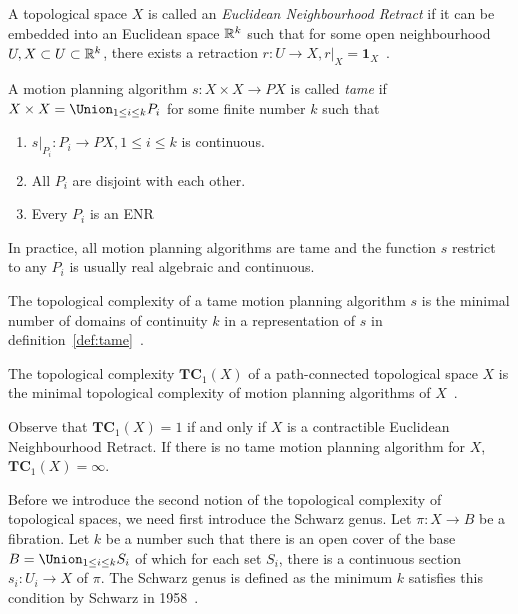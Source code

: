 A topological space \(X\) is called an \textit{Euclidean Neighbourhood Retract} if it can be embedded into an Euclidean space \(\mathbb{R}^k\) such that for some open neighbourhood \(U, X\subset U\subset \mathbb{R}^k\), there exists a retraction \(r:U\to X,r|_X=\mathbf{1}_X\)~\cite{farber2004instabilities}.
\begin{definition}\label{def:tame}
  A motion planning algorithm \(s:X\times X\to PX\) is called \emph{tame} if \(X\times X=\Union_{1\le i\le k} P_i\) for some finite number \(k\) such that
  \begin{enumerate}[label=\arabic*)]
  \item \(s|_{P_i}:P_i\to PX, 1\le i\le k\) is continuous.
  \item All \(P_i\) are disjoint with each other.
  \item Every \(P_i\) is an ENR
  \end{enumerate}
\end{definition}

In practice, all motion planning algorithms are tame and the function \(s\) restrict to any \(P_i\) is usually real algebraic and continuous.

\begin{definition}
  The topological complexity of a tame motion planning algorithm \(s\) is the minimal number of domains of continuity \(k\) in a representation of \(s\) in definition~\ref{def:tame}~\cite{farber2006topology}.
\end{definition}

\begin{definition}
  The topological complexity \(\mathbf{TC}_1(X)\) of a path-connected topological space \(X\) is the minimal topological complexity of motion planning algorithms of \(X\)~\cite{farber2006topology}.
\end{definition}

Observe that \(\mathbf{TC}_1(X)=1\) if and only if \(X\) is a contractible Euclidean Neighbourhood Retract.
If there is no tame motion planning algorithm for \(X\), \(\mathbf{TC}_1(X)=\infty\).

Before we introduce the second notion of the topological complexity of topological spaces, we need first introduce the Schwarz genus.
Let \(\pi: X\to B\) be a fibration. Let \(k\) be a number such that there is an open cover of the base \(B=\Union_{1\le i\le k} S_i\) of which for each set \(S_i\), there is a continuous section \(s_i:U_i\to X\) of \(\pi\).
The Schwarz genus is defined as the minimum \(k\) satisfies this condition by Schwarz in 1958~\cite{schwarz1962genus}.

